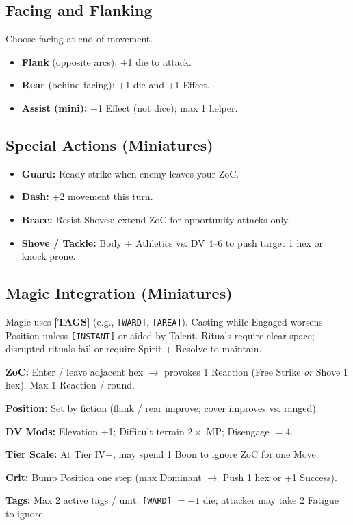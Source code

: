 \subsection{Facing and Flanking}\label{subsec:facing_flanking}
Choose facing at end of movement.
\begin{itemize}[nosep]
    \item \textbf{Flank} (opposite arcs): +1 die to attack.
    \item \textbf{Rear} (behind facing): +1 die and +1 Effect.
    \item \textbf{Assist (mini):} +1 Effect (not dice); max 1 helper.
\end{itemize}

\subsection{Special Actions (Miniatures)}\label{subsec:special_actions_mini}
\begin{itemize}[nosep]
    \item \textbf{Guard:} Ready strike when enemy leaves your ZoC.
    \item \textbf{Dash:} +2 movement this turn.
    \item \textbf{Brace:} Resist Shoves; extend ZoC for opportunity attacks only.
    \item \textbf{Shove / Tackle:} Body + Athletics vs. DV 4--6 to push target 1 hex or knock prone.
\end{itemize}

\subsection{Magic Integration (Miniatures)}\label{subsec:magic_mini}
Magic uses \textbf{[TAGS]} (e.g., \texttt{[WARD]}, \texttt{[AREA]}). Casting while Engaged worsens Position unless \texttt{[INSTANT]} or aided by Talent. Rituals require clear space; disrupted rituals fail or require Spirit + Resolve to maintain.

\begin{tcolorbox}[title={Miniatures Quick Reference},colback=white!98!gray,colframe=black!50!gray,boxrule=0.4pt,fontupper=\small,breakable]
\textbf{ZoC:} Enter / leave adjacent hex $\rightarrow$ provokes 1 Reaction (Free Strike \emph{or} Shove 1 hex). Max 1 Reaction / round.

\textbf{Position:} Set by fiction (flank / rear improve; cover improves vs. ranged).

\textbf{DV Mods:} Elevation +1; Difficult terrain $2\times$ MP; Disengage $=4$.

\textbf{Tier Scale:} At Tier IV+, may spend 1 Boon to ignore ZoC for one Move.

\textbf{Crit:} Bump Position one step (max Dominant $\rightarrow$ Push 1 hex or +1 Success).

\textbf{Tags:} Max 2 active tags / unit. \texttt{[WARD]} $= -1$ die; attacker may take 2 Fatigue to ignore.
\end{tcolorbox}


